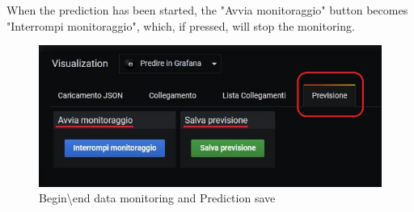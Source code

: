 When the prediction has been started, the "Avvia monitoraggio" button becomes "Interrompi monitoraggio", which, if pressed, will stop the monitoring.

\begin{figure}[H]
\centering
\includegraphics[scale=0.95]{img/plug-in/save_previsione.png}
\caption{Begin\textbackslash end data monitoring and Prediction save}

\end{figure} 
 

